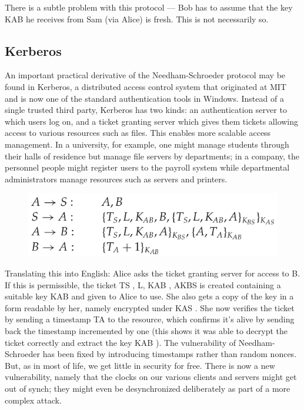 		There is a subtle problem with this protocol — Bob has to assume that the
		key KAB he receives from Sam (via Alice) is fresh. This is not necessarily so.

	\subsection{Kerberos}
		An important practical derivative of the Needham-Schroeder protocol may be
		found in Kerberos, a distributed access control system that originated at MIT
		and is now one of the standard authentication tools in Windows. Instead
		of a single trusted third party, Kerberos has two kinds: an authentication server
		to which users log on, and a ticket granting server which gives them tickets
		allowing access to various resources such as files. This enables more scalable
		access management. In a university, for example, one might manage students
		through their halls of residence but manage file servers by departments; in
		a company, the personnel people might register users to the payroll system
		while departmental administrators manage resources such as servers and
		printers.

		\begin{figure}[H]
			\centering
			\includegraphics[scale=0.5]{pics/Kerberos.png}
		\end{figure}
		
		Translating this into English: Alice asks the ticket granting server for access
		to B. If this is permissible, the ticket {TS , L, KAB , A}KBS is created containing a
		suitable key KAB and given to Alice to use. She also gets a copy of the key
		in a form readable by her, namely encrypted under KAS . She now verifies the
		ticket by sending a timestamp TA to the resource, which confirms it’s alive by
		sending back the timestamp incremented by one (this shows it was able to
		decrypt the ticket correctly and extract the key KAB ).
		The vulnerability of Needham-Schroeder has been fixed by introducing
		timestamps rather than random nonces. But, as in most of life, we get little
		in security for free. There is now a new vulnerability, namely that the clocks
		on our various clients and servers might get out of synch; they might even be
		desynchronized deliberately as part of a more complex attack.

